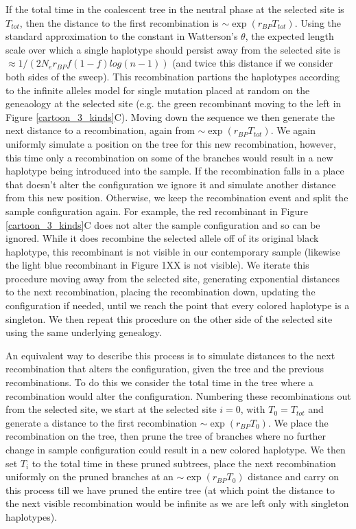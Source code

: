 \documentclass[a4paper,10pt]{article}
\begin{document}
If the total time in the coalescent tree in the neutral phase at the selected site is $T_{tot}$, then the distance to the first recombination is $\sim \exp \left( r_{BP} T_{tot} \right)$. Using the standard approximation to the constant in Watterson's $\theta$, the expected length scale over which a single haplotype should persist away from the selected site is $\approx 1/( 2 N_e r_{BP}f\left(1-f\right) log(n-1))$ (and twice this distance if we consider both sides of the sweep). This recombination partions the haplotypes according to the infinite alleles model for single mutation placed at random on the geneaology at the selected site (e.g. the green recombinant moving to the left in Figure \ref{cartoon_3_kinds}C). Moving down the sequence we then generate the next distance to a recombination, again from $\sim \exp \left( r_{BP} T_{tot} \right)$. We again uniformly simulate a position on the tree for this new recombination, however, this time only a recombination on some of the branches would result in a new haplotype being introduced into the sample. If the recombination falls in a place that doesn't alter the configuration we ignore it and simulate another distance from this new position. Otherwise, we keep the recombination event and split the sample configuration again. For example, the red recombinant in Figure \ref{cartoon_3_kinds}C does not alter the sample configuration and so can be ignored. While it does recombine the selected allele off of its original black haplotype, this recombinant is not visible in our contemporary sample (likewise the light blue recombinant in Figure 1XX is not visible). We iterate this procedure moving away from the selected site, generating exponential distances to the next recombination, placing the recombination down, updating the configuration if needed, until we reach the point that every colored haplotype is a singleton. We then repeat this procedure on the other side of the selected site using the same underlying genealogy.

An equivalent way to describe this process is to simulate distances to the next recombination that alters the configuration, given the tree and the previous recombinations. To do this we consider the total time in the tree where a recombination would alter the configuration. Numbering these recombinations out from the selected site,  we start at the selected site $i=0$, with $T_0 = T_{tot}$ and generate a distance to the first recombination $\sim \exp(r_{BP} T_0)$. We place the recombination on the tree, then prune the tree of branches where no further change in sample configuration could result in a new colored haplotype. We then set $T_i$ to the total time in these pruned subtrees, place the next recombination uniformly on the pruned branches at an $\sim \exp(r_{BP} T_0)$ distance and carry on this process till we have pruned the entire tree (at which point the distance to the next visible recombination would be infinite as we are left only with singleton haplotypes). 
\end{document}

